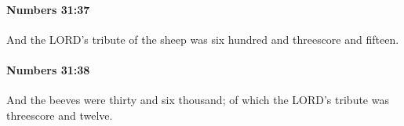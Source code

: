 		\paragraph{Numbers 31:37} %
			\label{NUMBERS-31-37}

			And the LORD’s tribute of the sheep was six hundred and threescore and fifteen.


		\paragraph{Numbers 31:38} %
			\label{NUMBERS-31-38}

			And the beeves were thirty and six thousand; of which the LORD’s tribute was threescore and twelve.


